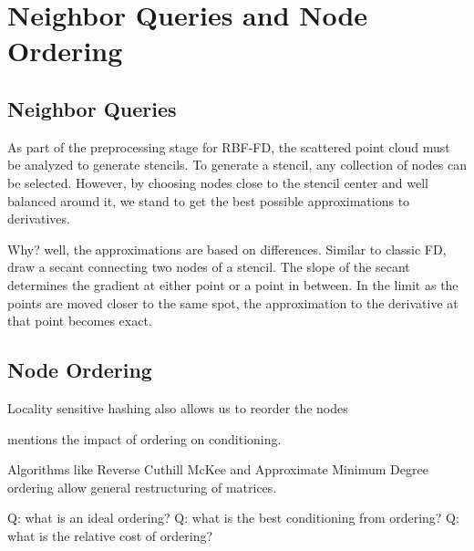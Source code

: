 
\chapter{Neighbor Queries and Node Ordering}


\section{Neighbor Queries} 

As part of the preprocessing stage for RBF-FD, the scattered point cloud must be analyzed to generate stencils. To generate a stencil, any collection of nodes can be selected. However, by choosing nodes close to the stencil center and well balanced around it, we stand to get the best possible approximations to derivatives. 

Why? well, the approximations are based on differences. Similar to classic FD, draw a secant connecting two nodes of a stencil. The slope of the secant determines the gradient at either point or a point in between. In the limit as the points are moved closer to the same spot, the approximation to the derivative at that point becomes exact. 

\section{Node Ordering}

Locality sensitive hashing also allows us to reorder the nodes

\cite{Saad2003} mentions the impact of ordering on conditioning.

Algorithms like Reverse Cuthill McKee and Approximate Minimum Degree ordering allow general restructuring of matrices. 


Q: what is an ideal ordering?
Q: what is the best conditioning from ordering?
Q: what is the relative cost of ordering?


